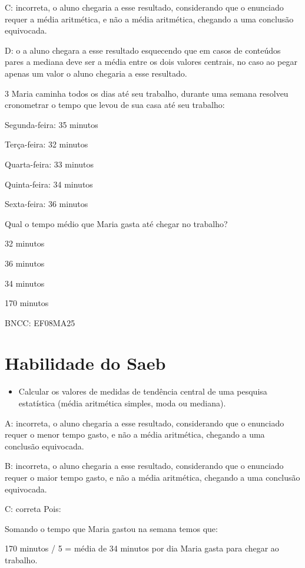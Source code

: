 C: incorreta, o aluno chegaria a esse resultado, considerando que o
enunciado requer a média aritmética, e não a média aritmética, chegando
a uma conclusão equivocada.

D: o a aluno chegara a esse resultado esquecendo que em casos de
conteúdos pares a mediana deve ser a média entre os dois valores
centrais, no caso ao pegar apenas um valor o aluno chegaria a esse
resultado.

\num{3} Maria caminha todos os dias até seu trabalho, durante uma semana
resolveu cronometrar o tempo que levou de sua casa até seu trabalho:

Segunda-feira: 35 minutos

Terça-feira: 32 minutos

Quarta-feira: 33 minutos

Quinta-feira: 34 minutos

Sexta-feira: 36 minutos

Qual o tempo médio que Maria gasta até chegar no trabalho?

\item 32 minutos
\item 36 minutos
\item 34 minutos
\item 170 minutos

BNCC: EF08MA25

\section{Habilidade do Saeb}

\begin{itemize}
\tightlist

\item 
  Calcular os valores de medidas de tendência central de uma pesquisa
  estatística (média aritmética simples, moda ou mediana).
\end{itemize}

A: incorreta, o aluno chegaria a esse resultado, considerando que o
enunciado requer o menor tempo gasto, e não a média aritmética, chegando
a uma conclusão equivocada.

B: incorreta, o aluno chegaria a esse resultado, considerando que o
enunciado requer o maior tempo gasto, e não a média aritmética, chegando
a uma conclusão equivocada.

C: correta Pois:

Somando o tempo que Maria gastou na semana temos que:

170 minutos / 5 = média de 34 minutos por dia Maria gasta para chegar ao
trabalho.

